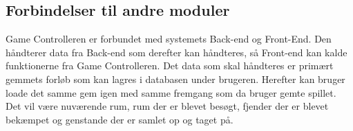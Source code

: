 \subsection{Forbindelser til andre moduler}
Game Controlleren er forbundet med systemets Back-end og Front-End. Den håndterer data fra Back-end som derefter kan håndteres, så Front-end kan kalde funktionerne fra Game Controlleren. Det data som skal håndteres er primært gemmets forløb som kan lagres i databasen under brugeren. Herefter kan bruger loade det samme gem igen med samme fremgang som da bruger gemte spillet. Det vil være nuværende rum, rum der er blevet besøgt, fjender der er blevet bekæmpet og genstande der er samlet op og taget på.